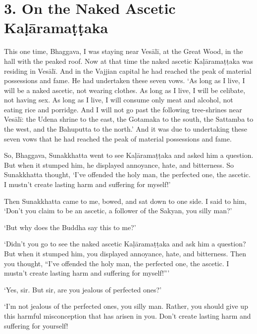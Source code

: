 \documentclass[12pt,openany]{book}%
\begin{document}
\section*{3. On the Naked Ascetic \textsanskrit{Kaḷāramaṭṭaka} }

This one time, Bhaggava, I was staying near \textsanskrit{Vesālī}, at the Great Wood, in the hall with the peaked roof. Now at that time the naked ascetic \textsanskrit{Kaḷāramaṭṭaka} was residing in \textsanskrit{Vesālī}. And in the Vajjian capital he had reached the peak of material possessions and fame. He had undertaken these seven vows. ‘As long as I live, I will be a naked ascetic, not wearing clothes. As long as I live, I will be celibate, not having sex. As long as I live, I will consume only meat and alcohol, not eating rice and porridge. And I will not go past the following tree-shrines near \textsanskrit{Vesālī}: the Udena shrine to the east, the Gotamaka to the south, the Sattamba to the west, and the Bahuputta to the north.’ And it was due to undertaking these seven vows that he had reached the peak of material possessions and fame. 

So, Bhaggava, Sunakkhatta went to see \textsanskrit{Kaḷāramaṭṭaka} and asked him a question. But when it stumped him, he displayed annoyance, hate, and bitterness. So Sunakkhatta thought, ‘I’ve offended the holy man, the perfected one, the ascetic. I mustn’t create lasting harm and suffering for myself!’ 

Then Sunakkhatta came to me, bowed, and sat down to one side. I said to him, ‘Don’t you claim to be an ascetic, a follower of the Sakyan, you silly man?’ 

‘But why does the Buddha say this to me?’ 

‘Didn’t you go to see the naked ascetic \textsanskrit{Kaḷāramaṭṭaka} and ask him a question? But when it stumped him, you displayed annoyance, hate, and bitterness. Then you thought, “I’ve offended the holy man, the perfected one, the ascetic. I mustn’t create lasting harm and suffering for myself!”’ 

‘Yes, sir. But sir, are you jealous of perfected ones?’ 

‘I’m not jealous of the perfected ones, you silly man. Rather, you should give up this harmful misconception that has arisen in you. Don’t create lasting harm and suffering for yourself! 
\end{document}
